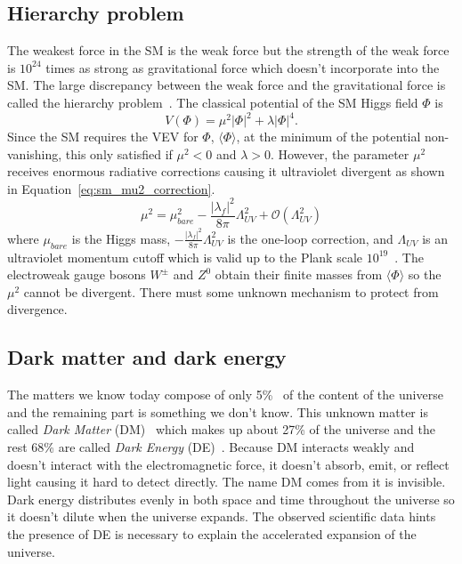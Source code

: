 \subsection{Hierarchy problem}
\label{subsec:sm_hierarchy_problem}
The weakest force in the SM is the weak force but the strength of the weak force is $10^{24}$ times as strong as gravitational force which doesn't incorporate into the SM.
The large discrepancy between the weak force and the gravitational force is called the hierarchy problem~\cite{Martin:1997ns, Chankowski:1998za, maarten_brak}.
The classical potential of the SM Higgs field $\Phi$ is
%
\begin{equation}
    V(\Phi) = \mu^{2} |\Phi|^2 + \lambda |\Phi|^4.
\end{equation}
%
Since the SM requires the VEV for $\Phi$, $\langle \Phi \rangle$, at the minimum of the potential non-vanishing, this only satisfied if $\mu^{2} < 0$ and $\lambda > 0$.
However, the parameter $\mu^{2}$ receives enormous radiative corrections causing it ultraviolet divergent as shown in Equation~\ref{eq:sm_mu2_correction}.
%
\begin{equation}
    \mu^{2} = \mu_{bare}^{2} - \frac{|\lambda_{f}|^{2}}{8\pi}\Lambda_{UV}^{2} + \mathcal{O}(\Lambda_{UV}^{2})
    \label{eq:sm_mu2_correction}
\end{equation}
%
where $\mu_{bare}$ is the Higgs mass, $- \frac{|\lambda_{f}|^{2}}{8\pi}\Lambda_{UV}^{2}$ is the one-loop correction, and $\Lambda_{UV}$ is an ultraviolet momentum cutoff which is valid up to the Plank scale $10^{19}$~{\GeV}.
The electroweak gauge bosons $W^{\pm}$ and $Z^{0}$ obtain their finite masses from $\langle \Phi \rangle$ so the $\mu^{2}$ cannot be divergent.
There must some unknown mechanism to protect from divergence.


\subsection{Dark matter and dark energy}
\label{subsec:sm_dm}
The matters we know today compose of only 5\%~\cite{Bennett:2012zja, Ade:2013sjv} of the content of the universe and the remaining part is something we don't know.
This unknown matter is called \textit{Dark Matter} (DM)~\cite{Bertone:2004pz} which makes up about 27\% of the universe and the rest 68\% are called \textit{Dark Energy} (DE)~\cite{Bennett:2012zja, Ade:2013sjv}.
Because DM interacts weakly and doesn't interact with the electromagnetic force, it doesn't absorb, emit, or reflect light causing it hard to detect directly. 
The name DM comes from it is invisible.
Dark energy distributes evenly in both space and time throughout the universe so it doesn't dilute when the universe expands.
The observed scientific data hints the presence of DE is necessary to explain the accelerated expansion of the universe.


